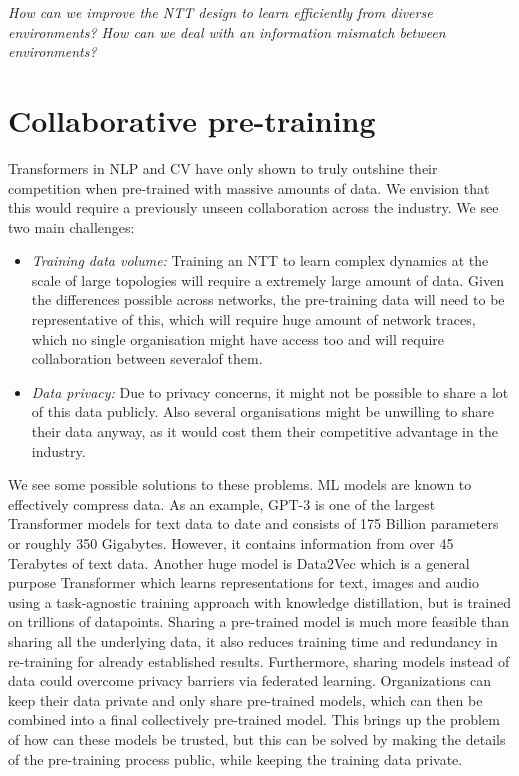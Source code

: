 \vspace{-0.3cm}
\emph{How can we improve the NTT design to learn efficiently from diverse environments? How can we deal with an information mismatch between environments?}


\section{Collaborative pre-training}
\label{sec:collab}

Transformers in NLP and CV have only shown to truly outshine their competition when pre-trained with massive amounts of data. We envision that this would require a previously unseen collaboration across the industry. We see two main challenges:
\begin{itemize}
\item \emph{Training data volume:} Training an NTT to learn complex dynamics at the scale of large topologies will require a extremely large amount of data. Given the differences possible across networks, the pre-training data will need to be representative of this, which will require huge amount of network traces, which no single organisation might have access too and will require collaboration between severalof them.
\item \emph{Data privacy:} Due to privacy concerns, it might not be possible to share a lot of this data publicly. Also several organisations might be unwilling to share their data anyway, as it would cost them their competitive advantage in the industry.
\end{itemize}


We see some possible solutions to these problems. ML models are known to effectively compress data. As an example, GPT-3\cite{brownLanguageModelsAre2020} is one of the largest Transformer models for text data to date and consists of 175 Billion parameters or roughly 350 Gigabytes. However, it contains information from over 45 Terabytes of text data. Another huge model is Data2Vec\cite{baevskiData2vecGeneralFramework2022} which is a general purpose Transformer which learns representations for text, images and audio using a task-agnostic training approach with knowledge distillation\cite{kd}, but is trained on trillions of datapoints. Sharing a pre-trained model is much more feasible than sharing all the underlying data, it also reduces training time and redundancy in re-training for already established results.
Furthermore, sharing models instead of data could overcome privacy barriers via federated learning\cite{kairouzAdvancesOpenProblems2021}. Organizations can keep their data private and only share pre-trained models, which can then be combined into a final collectively pre-trained model. This brings up the problem of how can these models be trusted, but this can be solved by making the details of the pre-training process public, while keeping the training data private.

